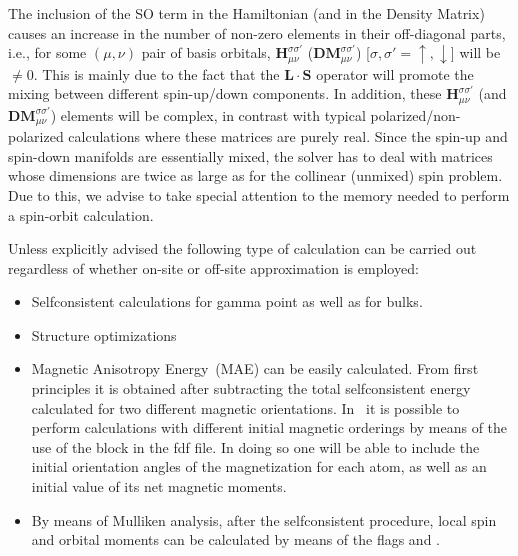 The inclusion of the SO term in the Hamiltonian (and in the Density
Matrix) causes an increase in the number of non-zero elements in their
off-diagonal parts, i.e., for some $(\mu,\nu)$ pair of basis
orbitals, $\mathbf H^{\sigma\sigma'}_{\mu\nu}$ ($\mathbf{DM}^{\sigma\sigma'}_{\mu\nu}$)
[$\sigma,\sigma'=\uparrow,\downarrow$] will be $\neq0$. This is
mainly due to the fact that the $\mathbf L\cdot\mathbf S$ operator
will promote the mixing between different spin-up/down components.
In addition, these $\mathbf H^{\sigma\sigma'}_{\mu\nu}$ (and
$\mathbf{DM}^{\sigma\sigma'}_{\mu\nu}$) elements will be complex, in contrast
with typical polarized/non-polarized calculations where these
matrices are purely real. Since the spin-up and spin-down manifolds
are essentially mixed, the solver has to deal with matrices whose
dimensions are twice as large as for the collinear (unmixed) spin
problem. Due to this, we advise to take special
attention to the memory needed to perform a spin-orbit calculation.


Unless explicitly advised the following type of calculation can be carried out 
regardless of whether on-site or off-site approximation is employed: 
\begin{itemize}
  \item Selfconsistent calculations for gamma point as well as for
  bulks.
  \item Structure optimizations 
  \item Magnetic Anisotropy Energy~(MAE) can be easily
    calculated. From first principles it is obtained after subtracting
    the total selfconsistent energy calculated for two different
    magnetic orientations. In \siesta\ it is possible to perform
    calculations with different initial magnetic orderings
    by means of the use of the block  in the fdf
    file. In doing so one will be able to include the initial
    orientation angles of the magnetization for each atom, as well as
    an initial value of its net magnetic moments.
  \item By means of Mulliken analysis, after the selfconsistent
  procedure, local spin and orbital moments can be calculated by means
  of the flags  and .
\end{itemize}

